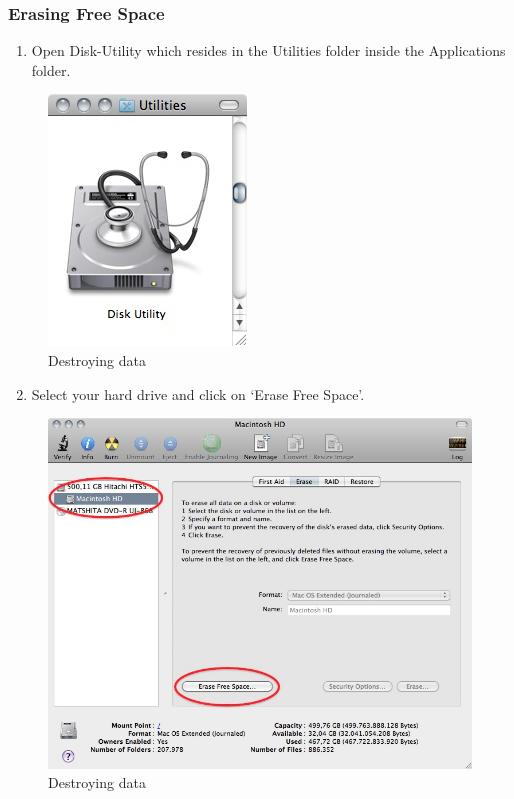\subsubsection{Erasing Free Space}

\begin{enumerate}[1.]
\item
  Open Disk-Utility which resides in the Utilities folder inside the
  Applications folder.
\end{enumerate}
\begin{figure}[htbp]
\centering
\includegraphics{destroy_data_004.jpg}
\caption{Destroying data}
\end{figure}

\begin{enumerate}[1.]
\setcounter{enumi}{1}
\item
  Select your hard drive and click on `Erase Free Space'.
\end{enumerate}
\begin{figure}[htbp]
\centering
\includegraphics{destroy_data_005.jpg}
\caption{Destroying data}
\end{figure}

